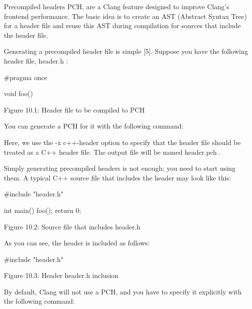 Precompiled headers PCH, are a Clang feature designed to improve Clang's frontend performance. The basic idea is to create an AST (Abstract Syntax Tree) for a header file and reuse this AST during compilation for sources that include the header file.

Generating a precompiled header file is simple [5]. Suppose you have the following header file, header.h :

\begin{cpp}
#pragma once

void foo() {
}
\end{cpp}

\begin{center}
Figure 10.1: Header file to be compiled to PCH
\end{center}

You can generate a PCH for it with the following command:


Here, we use the -x c++-header option to specify that the header file should be treated as a C++ header file. The output file will be named header.pch .

Simply generating precompiled headers is not enough; you need to start using them. A typical C++ source file that includes the header may look like this:

\begin{cpp}
#include "header.h"

int main() {
  foo();
  return 0;
}
\end{cpp}

\begin{center}
Figure 10.2: Source file that includes header.h
\end{center}

As you can see, the header is included as follows:

\begin{cpp}
#include "header.h"
\end{cpp}

\begin{center}
Figure 10.3: Header header.h inclusion
\end{center}

By default, Clang will not use a PCH, and you have to specify it explicitly with the following command:

